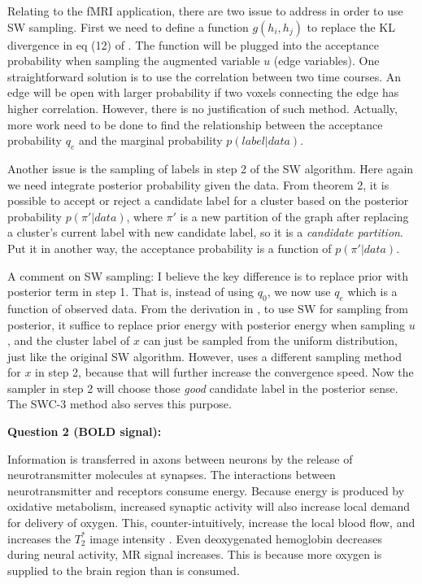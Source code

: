 \documentclass[12pt]{article}
\begin{document}
Relating to the fMRI application, there are two issue to address in order to use
SW sampling. First we need to define a function $g(h_i, h_j)$ to replace the KL
divergence in eq (12) of \citeauthor{barbu2005generalizing}. The function will
be plugged into the acceptance probability when sampling the augmented variable
$u$ (edge variables). One straightforward solution is to use the correlation
between two time courses. An edge will be open with larger probability if two
voxels connecting the edge has higher correlation. However, there is no
justification of such method. Actually, more work need to be done to find the
relationship between the acceptance probability $q_e$ and the marginal
probability $p(label | data)$.


Another issue is the sampling of labels in step 2 of the SW algorithm. Here
again we need integrate posterior probability given the data. From theorem 2, it
is possible to accept or reject a candidate label for a cluster based on the
posterior probability $p(\pi' | data)$, where $\pi'$ is a new partition of the
graph after replacing a cluster's current label with new candidate label, so it
is a \emph{candidate partition}. Put it in another way, the acceptance
probability is a function of $p(\pi' | data)$.

A comment on SW sampling: I believe the key difference is to replace prior with
posterior term in step 1. That is, instead of using $q_0$, we now use $q_e$
which is a function of observed data. From the derivation in \citep[chap
  6.5]{rubinstein2008simulation}, to use SW for sampling from posterior, it
suffice to replace prior energy with posterior energy when sampling $u$, and the
cluster label of $x$ can just be sampled from the uniform distribution, just
like the original SW algorithm. However, \citeauthor{barbu2005generalizing} uses
a different sampling method for $x$ in step 2, because that will further
increase the convergence speed. Now the sampler in step 2 will choose those
\emph{good} candidate label in the posterior sense. The SWC-3 method also serves
this purpose.

\newpage
\textbf{Question 2 (BOLD signal):} 

Information is transferred in axons between neurons by the release of
neurotransmitter molecules at synapses. The interactions between
neurotransmitter and receptors consume energy. Because energy is produced by
oxidative metabolism, increased synaptic activity will also increase local
demand for delivery of oxygen. This, counter-intuitively, increase the local
blood flow, and increases the $T_2^*$ image intensity
\citep{lewin2003functional,stroman2011essentials}. Even deoxygenated hemoglobin
decreases during neural activity, MR signal increases. This is because more
oxygen is supplied to the brain region than is consumed.
\end{document}
